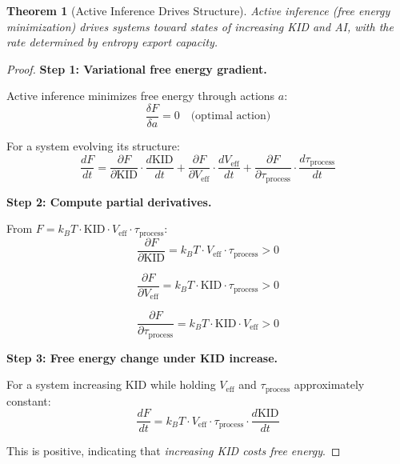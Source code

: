 \documentclass[11pt,a4paper]{article}
\newtheorem{theorem}{Theorem}[section]
\begin{document}
\begin{theorem}[Active Inference Drives Structure]
Active inference (free energy minimization) drives systems toward states of increasing KID and AI, with the rate determined by entropy export capacity.
\end{theorem}

\begin{proof}
\textbf{Step 1: Variational free energy gradient.}

Active inference minimizes free energy through actions $a$:
\begin{equation}
\frac{\delta F}{\delta a} = 0 \quad \text{(optimal action)}
\end{equation}

For a system evolving its structure:
\begin{equation}
\frac{dF}{dt} = \frac{\partial F}{\partial \text{KID}} \cdot \frac{d\text{KID}}{dt} + \frac{\partial F}{\partial V_{\text{eff}}} \cdot \frac{dV_{\text{eff}}}{dt} + \frac{\partial F}{\partial \tau_{\text{process}}} \cdot \frac{d\tau_{\text{process}}}{dt}
\end{equation}

\textbf{Step 2: Compute partial derivatives.}

From $F = k_B T \cdot \text{KID} \cdot V_{\text{eff}} \cdot \tau_{\text{process}}$:
\begin{equation}
\frac{\partial F}{\partial \text{KID}} = k_B T \cdot V_{\text{eff}} \cdot \tau_{\text{process}} > 0
\end{equation}

\begin{equation}
\frac{\partial F}{\partial V_{\text{eff}}} = k_B T \cdot \text{KID} \cdot \tau_{\text{process}} > 0
\end{equation}

\begin{equation}
\frac{\partial F}{\partial \tau_{\text{process}}} = k_B T \cdot \text{KID} \cdot V_{\text{eff}} > 0
\end{equation}

\textbf{Step 3: Free energy change under KID increase.}

For a system increasing KID while holding $V_{\text{eff}}$ and $\tau_{\text{process}}$ approximately constant:
\begin{equation}
\frac{dF}{dt} = k_B T \cdot V_{\text{eff}} \cdot \tau_{\text{process}} \cdot \frac{d\text{KID}}{dt}
\end{equation}

This is positive, indicating that \emph{increasing KID costs free energy}.


\end{proof}
\end{document}
